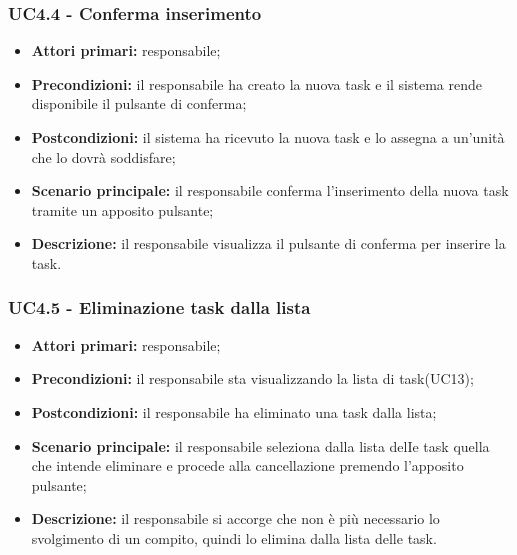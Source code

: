 \subsubsection{UC4.4 - Conferma inserimento}

\begin{itemize}
	\item 	\textbf{Attori primari:} responsabile;
	\item 	\textbf{Precondizioni:} il responsabile ha creato la nuova task e il sistema rende disponibile il pulsante di conferma;
	\item 	\textbf{Postcondizioni:} il sistema ha ricevuto la nuova task e lo assegna a un’unità che lo dovrà soddisfare;
	\item 	\textbf{Scenario principale:} il responsabile conferma l’inserimento della nuova task tramite un apposito pulsante;
	\item 	\textbf{Descrizione:} il responsabile visualizza il pulsante di conferma per inserire la task.
\end{itemize}

\subsubsection{UC4.5 - Eliminazione task dalla lista}

\begin{itemize}
	\item 	\textbf{Attori primari:} responsabile;
	\item 	\textbf{Precondizioni:} il responsabile sta visualizzando la lista di task(UC13);
	\item 	\textbf{Postcondizioni:} il responsabile ha eliminato una task dalla lista;
	\item 	\textbf{Scenario principale:} il responsabile seleziona dalla lista delIe task quella che intende eliminare e procede alla cancellazione premendo l’apposito pulsante;
	\item 	\textbf{Descrizione:} il responsabile si accorge che non è più necessario lo svolgimento di un compito, quindi lo elimina dalla lista delle task.

\end{itemize}

